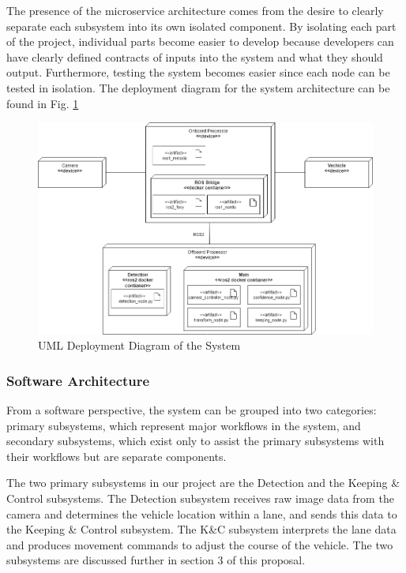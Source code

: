 \documentclass[titlepage,draft]{article}
\begin{document}
The presence of the microservice architecture comes from the desire to clearly separate each subsystem into its own isolated component. By isolating each part of the project, individual parts become easier to develop because developers can have clearly defined contracts of inputs into the system and what they should output. Furthermore, testing the system becomes easier since each node can be tested in isolation. The deployment diagram for the system architecture can be found in Fig. \ref{fig:deployment}

\begin{figure}
	\centering
	\includegraphics[width=6in]{deployment_uml}
	\caption{UML Deployment Diagram of the System}
	\label{fig:deployment}
\end{figure}

\subsubsection{Software Architecture}
From a software perspective, the system can be grouped into two categories: primary subsystems, which represent major workflows in the system, and secondary subsystems, which exist only to assist the primary subsystems with their workflows but are separate components.

The two primary subsystems in our project are the Detection and the Keeping \& Control subsystems. The Detection subsystem receives raw image data from the camera and determines the vehicle location within a lane, and sends this data to the Keeping \& Control subsystem. The K\&C subsystem interprets the lane data and produces movement commands to adjust the course of the vehicle. The two subsystems are discussed further in section 3 of this proposal.
\end{document}
